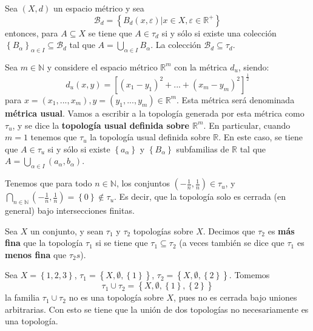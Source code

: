\documentclass[12pt]{report}
\theoremstyle{largebreak}
\begin{document}
    \begin{cor}
        Sea $(X,d)$ un espacio métrico y sea
        \begin{equation*}
            \mathcal{B}_d=\left\{B_d(x,\varepsilon)|x\in X,\varepsilon\in\mathbb{R}^+ \right\}
        \end{equation*}
        entonces, para $A\subseteq X$ se tiene que $A\in\tau_d$ si y sólo si existe una colección $\left\{B_\alpha \right\}_{\alpha\in I}\subseteq \mathcal{B}_d$ tal que $A=\bigcup_{\alpha\in I}B_\alpha$. La colección $\mathcal{B}_d\subseteq\tau_d$.
    \end{cor}

    \begin{exa}
        Sea $m\in\mathbb{N}$ y considere el espacio métrico $\mathbb{R}^m$ con la métrica $d_u$, siendo:
        \begin{equation*}
            d_u(x,y)=[(x_1-y_1)^2+...+(x_m-y_m)^2]^{\frac{1}{2}}
        \end{equation*}
        para $x=(x_1,...,x_m),y=(y_1,...,y_m)\in\mathbb{R}^m$. Esta métrica será denominada \textbf{métrica usual}. Vamos a escribir a la topología generada por esta métrica como $\tau_u$, y se dice la \textbf{topología usual definida sobre $\mathbb{R}^m$}. En particular, cuando $m=1$ tenemos que $\tau_u$ la topología usual definida sobre $\mathbb{R}$. En este caso, se tiene que $A\in\tau_u$ si y sólo si existe $\left\{a_\alpha\right\}$ y $\left\{B_\alpha\right\}$ subfamilias de $\mathbb{R}$ tal que $A=\bigcup_{\alpha\in I}\left(a_\alpha,b_\alpha\right)$.
    \end{exa}

    \begin{obs}
        Tenemos que para todo $n\in\mathbb{N}$, los conjuntos $\left(-\frac{1}{n},\frac{1}{n}\right)\in\tau_u$, y $\bigcap_{n\in\mathbb{N}}\left(-\frac{1}{n},\frac{1}{n}\right)=\left\{0\right\}\notin\tau_u$. Es decir, que la topología solo es cerrada (en general) bajo intersecciones finitas.
    \end{obs}

    \begin{mydef}
        Sea $X$ un conjunto, y sean $\tau_1$ y $\tau_2$ topologías sobre $X$. Decimos que $\tau_2$ es \textbf{más fina} que la topología $\tau_1$ si se tiene que $\tau_1\subseteq\tau_2$ (a veces también se dice que $\tau_1$ es \textbf{menos fina} que $\tau_2s$).
    \end{mydef}

    \begin{exa}
        Sea $X=\left\{1,2,3\right\}$, $\tau_1=\left\{X,\emptyset,\left\{1\right\} \right\}$, $\tau_2=\left\{X,\emptyset,\left\{2\right\} \right\}$. Tomemos
        \begin{equation*}
            \tau_1\cup\tau_2=\left\{X,\emptyset,\left\{1\right\},\left\{2\right\}\right\}
        \end{equation*}
        la familia $\tau_1\cup\tau_2$ no es una topología sobre $X$, pues no es cerrada bajo uniones arbitrarias. Con esto se tiene que la unión de dos topologías no necesariamente es una topología.
    \end{exa}
\end{document}
